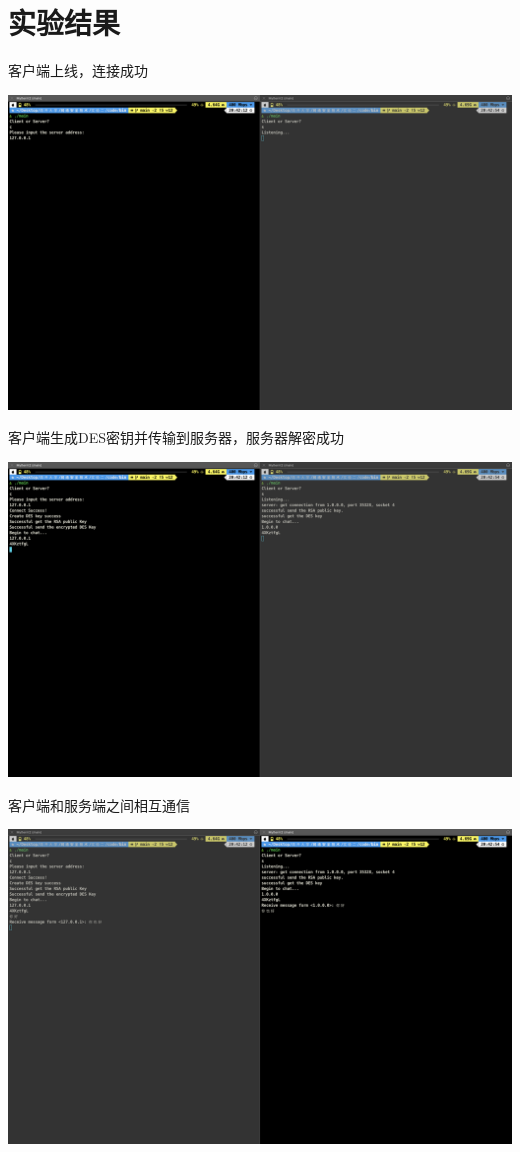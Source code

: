 \documentclass[UTF8,a4paper,10pt]{ctexart}
\begin{document}
\section{实验结果}
客户端上线，连接成功
\begin{center}
\includegraphics[scale = 0.23]{1.png}
\end{center}
客户端生成DES密钥并传输到服务器，服务器解密成功
\begin{center}
  \includegraphics[scale = 0.23]{2.png}
\end{center}
客户端和服务端之间相互通信
\begin{center}
  \includegraphics[scale = 0.23]{3.png}
\end{center}
\end{document}
